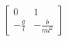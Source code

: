 \documentclass[preview]{standalone}
\begin{document}
\begin{align*}
\begin{bmatrix}0 & 1\\ -\frac{g}{l} & -\frac{b}{ml^2}\end{bmatrix}
\end{align*}
\end{document}

